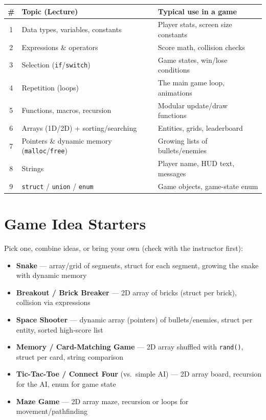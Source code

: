 \documentclass[11pt]{article}
\begin{document}
\begin{center}
\begin{tabular}{@{}clp{7.7cm}@{}}
\toprule
\# & Topic (Lecture) & Typical use in a game \\
\midrule
1 & Data types, variables, constants & Player stats, screen size constants \\
2 & Expressions \& operators & Score math, collision checks \\
3 & Selection (\texttt{if}/\texttt{switch}) & Game states, win/lose conditions \\
4 & Repetition (loops) & The main game loop, animations \\
5 & Functions, macros, recursion & Modular update/draw functions \\
6 & Arrays (1D/2D) + sorting/searching & Entities, grids, leaderboard \\
7 & Pointers \& dynamic memory (\texttt{malloc}/\texttt{free}) & Growing lists of bullets/enemies \\
8 & Strings & Player name, HUD text, messages \\
9 & \texttt{struct} / \texttt{union} / \texttt{enum} & Game objects, game-state enum \\
\bottomrule
\end{tabular}
\end{center}

\section*{Game Idea Starters}

Pick one, combine ideas, or bring your own (check with the instructor first):

\begin{itemize}[leftmargin=*,nosep]
  \item \textbf{Snake} --- array/grid of segments, struct for each segment, growing the snake with dynamic memory
  \item \textbf{Breakout / Brick Breaker} --- 2D array of bricks (struct per brick), collision via expressions
  \item \textbf{Space Shooter} --- dynamic array (pointers) of bullets/enemies, struct per entity, sorted high-score list
  \item \textbf{Memory / Card-Matching Game} --- 2D array shuffled with \texttt{rand()}, struct per card, string comparison
  \item \textbf{Tic-Tac-Toe / Connect Four} (vs.\ simple AI) --- 2D array board, recursion for the AI, enum for game state
  \item \textbf{Maze Game} --- 2D array maze, recursion or loops for movement/pathfinding
\end{itemize}
\end{document}
